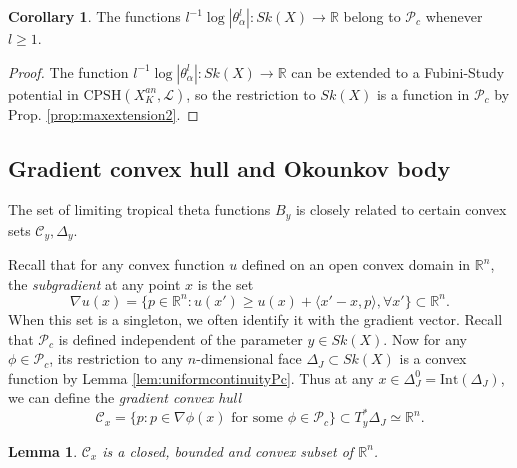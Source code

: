 \documentclass[a4paper]{article}
\newtheorem{lem}[thm]{Lemma}
\theoremstyle{definition}
\newtheorem{cor}[thm]{Corollary}
\newcommand{\R}{\mathbb{R}}
\begin{document}
	
	
	
	\begin{cor}\label{cor:tropicalthetainPc}
The functions $l^{-1} \log |\theta_\alpha^l| : Sk(X)\to \R$ belong to $\mathcal{P}_c$ whenever $l\geq 1$.
	\end{cor}
	
	
	
	\begin{proof}
	The function $l^{-1} \log |\theta_\alpha^l| : Sk(X)\to \R$ can be extended to a Fubini-Study potential in $\text{CPSH}(X_K^{an},\mathcal{L})$, so the restriction to $Sk(X)$ is a function in $\mathcal{P}_c$ by Prop. \ref{prop:maxextension2}.
	\end{proof}
	
	
	
	
	\subsection{Gradient convex hull and Okounkov body}\label{sec:gradientconvexhullOkounkovbody}
	
	
	
The set of limiting tropical theta functions $B_y$ is  closely related to certain convex sets $\mathcal{C}_y, \Delta_y$. 




Recall that for any convex function $u$ defined on an open convex domain in $\R^n$, the \emph{subgradient} at any point $x$ is the set 
\[
\nabla u(x)=\{     p\in \R^n:    u(x') \geq u(x)+ \langle x'-x, p\rangle , \forall x'     \}\subset \R^n.
\]
When this set is a singleton, we often identify it with the gradient vector.
Recall that $\mathcal{P}_c$ is defined independent of the parameter $y\in Sk(X)$.
Now for any $\phi\in \mathcal{P}_c$, its restriction to any $n$-dimensional face $\Delta_J\subset Sk(X)$ is a convex function by Lemma \ref{lem:uniformcontinuityPc}. Thus at any $x\in \Delta_J^0=\text{Int}(\Delta_J)$, we can define the \emph{gradient convex hull}
\begin{equation}
\mathcal{C}_x=  \{  p:    p\in \nabla \phi(x)  \text{ for some } \phi\in \mathcal{P}_c       \}  \subset T_y^* \Delta_J \simeq \R^n .
\end{equation}




\begin{lem}
$\mathcal{C}_x$ is a closed, bounded and convex subset of $\R^n$.
\end{lem}
\end{document}

